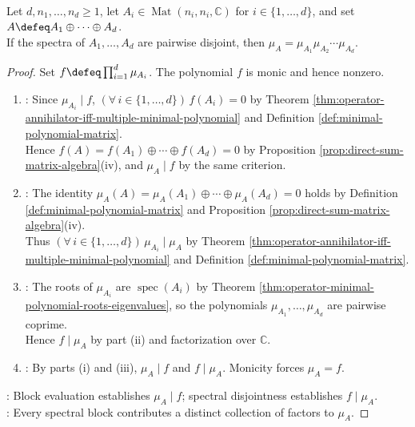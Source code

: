 \begin{theorem} \label{thm:minimal-polynomial-direct-sum-disjoint-spectra} \\
Let $d,n_1,\ldots,n_d\geq1$, let $A_i\in\operatorname{Mat}(n_i,n_i,\mathbb{C})$ for $i\in\{1,\ldots,d\}$, and set $A\defeq A_1\oplus\cdots\oplus A_d$.\\
If the spectra of $A_1,\ldots,A_d$ are pairwise disjoint, then $\mu_A=\mu_{A_1}\mu_{A_2}\cdots\mu_{A_d}$.
\begin{proof}
Set $f\defeq\prod_{i=1}^{d}\mu_{A_i}$. The polynomial $f$ is monic and hence nonzero.
\begin{enumerate}[label=(\roman*)]
\setlength{\itemsep}{0pt}
\item {}: Since $\mu_{A_i}\mid f$, $(\forall\,i\in\{1,\ldots,d\})\,f(A_i)=0$ by Theorem \ref{thm:operator-annihilator-iff-multiple-minimal-polynomial} and Definition \ref{def:minimal-polynomial-matrix}.\\
Hence $f(A)=f(A_1)\oplus\cdots\oplus f(A_d)=0$ by Proposition \ref{prop:direct-sum-matrix-algebra}(iv), and $\mu_A\mid f$ by the same criterion.
\item {}: The identity $\mu_A(A)=\mu_A(A_1)\oplus\cdots\oplus\mu_A(A_d)=0$ holds by Definition \ref{def:minimal-polynomial-matrix} and Proposition \ref{prop:direct-sum-matrix-algebra}(iv).\\
Thus $(\forall\,i\in\{1,\ldots,d\})\,\mu_{A_i}\mid\mu_A$ by Theorem \ref{thm:operator-annihilator-iff-multiple-minimal-polynomial} and Definition \ref{def:minimal-polynomial-matrix}.
\item {}: The roots of $\mu_{A_i}$ are $\operatorname{spec}(A_i)$ by Theorem \ref{thm:operator-minimal-polynomial-roots-eigenvalues}, so the polynomials $\mu_{A_1},\ldots,\mu_{A_d}$ are pairwise coprime.\\
Hence $f\mid\mu_A$ by part (ii) and factorization over $\mathbb{C}$.
\item {}: By parts (i) and (iii), $\mu_A\mid f$ and $f\mid\mu_A$. Monicity forces $\mu_A=f$.
\end{enumerate}
: Block evaluation establishes $\mu_A\mid f$; spectral disjointness establishes $f\mid\mu_A$.\\
: Every spectral block contributes a distinct collection of factors to $\mu_A$.
\end{proof}
\end{theorem}

